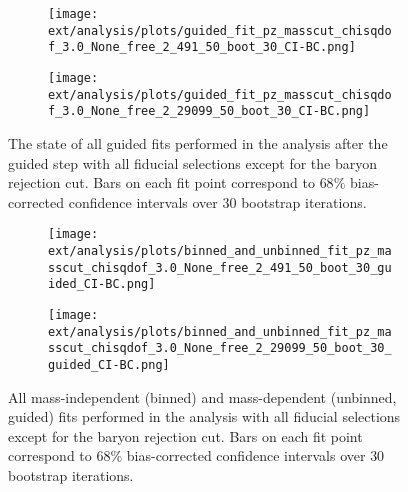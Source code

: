 \begin{figure}[htbp]
    \centering
    \begin{subfigure}{0.45\textwidth}
        \texttt{[image: ext/analysis/plots/guided\_fit\_pz\_masscut\_chisqdof\_3.0\_None\_free\_2\_491\_50\_boot\_30\_CI-BC.png]}
    \end{subfigure}
    \vspace{1em}
    \begin{subfigure}{0.45\textwidth}
        \texttt{[image: ext/analysis/plots/guided\_fit\_pz\_masscut\_chisqdof\_3.0\_None\_free\_2\_29099\_50\_boot\_30\_CI-BC.png]}
    \end{subfigure}
    \caption{The state of all guided fits performed in the analysis after the guided step with all fiducial selections except for the baryon rejection cut. Bars on each fit point correspond to $68\%$ bias-corrected confidence intervals over $ 30 $ bootstrap iterations.}
    \label{fig:guided-fit-all-no-baryon-rejection}
\end{figure}

\begin{figure}[htbp]
    \centering
    \begin{subfigure}{0.45\textwidth}
        \texttt{[image: ext/analysis/plots/binned\_and\_unbinned\_fit\_pz\_masscut\_chisqdof\_3.0\_None\_free\_2\_491\_50\_boot\_30\_guided\_CI-BC.png]}
    \end{subfigure}
    \vspace{1em}
    \begin{subfigure}{0.45\textwidth}
        \texttt{[image: ext/analysis/plots/binned\_and\_unbinned\_fit\_pz\_masscut\_chisqdof\_3.0\_None\_free\_2\_29099\_50\_boot\_30\_guided\_CI-BC.png]}
    \end{subfigure}
    \caption{All mass-independent (binned) and mass-dependent (unbinned, guided) fits performed in the analysis with all fiducial selections except for the baryon rejection cut. Bars on each fit point correspond to $68\%$ bias-corrected confidence intervals over $ 30 $ bootstrap iterations.}
    \label{fig:unbinned-guided-fit-all-no-baryon-rejection}
\end{figure}
